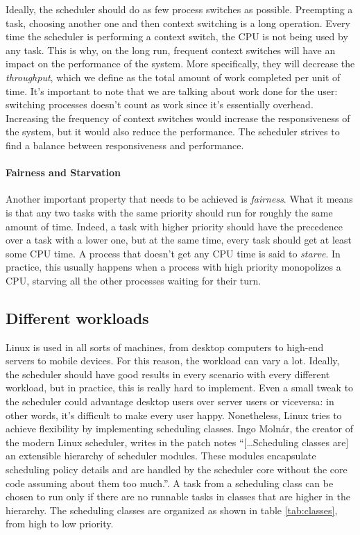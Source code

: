 Ideally, the scheduler should do as few process switches as possible. Preempting a task, choosing another one and then context switching is a long operation. Every time the scheduler is performing a context switch, the CPU is not being used by any task. This is why, on the long run, frequent context switches will have an impact on the performance of the system. More specifically, they will decrease the \textit{throughput}, which we define as the total amount of work completed per unit of time. It's important to note that we are talking about work done for the user: switching processes doesn't count as work since it's essentially overhead. Increasing the frequency of context switches would increase the responsiveness of the system, but it would also reduce the performance. The scheduler strives to find a balance between responsiveness and performance.

\paragraph{Fairness and Starvation}
Another important property that needs to be achieved is \textit{fairness}. What it means is that any two tasks with the same priority should run for roughly the same amount of time. Indeed, a task with higher priority should have the precedence over a task with a lower one, but at the same time, every task should get at least some CPU time. A process that doesn't get any CPU time is said to \textit{starve}. In practice, this usually happens when a process with high priority monopolizes a CPU, starving all the other processes waiting for their turn.

\subsection{Different workloads}  %
Linux is used in all sorts of machines, from desktop computers to high-end servers to mobile devices. For this reason, the workload can vary a lot. Ideally, the scheduler should have good results in every scenario with every different workload, but in practice, this is really hard to implement. Even a small tweak to the scheduler could advantage desktop users over server users or viceversa: in other words, it's difficult to make every user happy.\cite{nice_design} Nonetheless, Linux tries to achieve flexibility by implementing scheduling classes. Ingo Moln\'ar, the creator of the modern Linux scheduler, writes in the patch notes 
``[\dots Scheduling classes are] an extensible hierarchy of
scheduler modules. These modules encapsulate scheduling policy
details and are handled by the scheduler core without the core
code assuming about them too much.''\cite{ingo}. 
A task from a scheduling class can be chosen to run only if there are no runnable tasks in classes that are higher in the hierarchy. The scheduling classes are organized as shown in table \ref{tab:classes}, from high to low priority.

